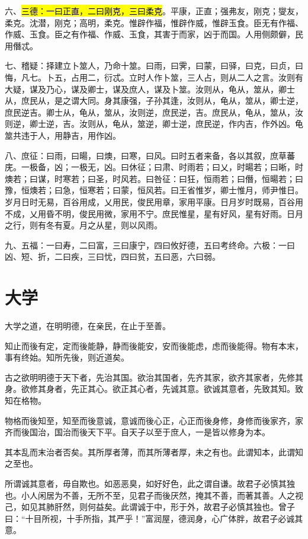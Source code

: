 六、\hl{三德：一曰正直，二曰刚克，三曰柔克}。平康，正直；强弗友，刚克；燮友，柔克。沈潜，刚克；高明，柔克。惟辟作福，惟辟作威，惟辟玉食。臣无有作福、作威、玉食。臣之有作福、作威、玉食，其害于而家，凶于而国。人用侧颇僻，民用僭忒。

七、稽疑：择建立卜筮人，乃命十筮。曰雨，曰霁，曰蒙，曰驿，曰克，曰贞，曰悔，凡七。卜五，占用二，衍忒。立时人作卜筮，三人占，则从二人之言。汝则有大疑，谋及乃心，谋及卿士，谋及庶人，谋及卜筮。汝则从，龟从，筮从，卿士从，庶民从，是之谓大同。身其康强，子孙其逢，汝则从，龟从，筮从，卿士逆，庶民逆吉。卿士从，龟从，筮从，汝则逆，庶民逆，吉。庶民从，龟从，筮从，汝则逆，卿士逆，吉。汝则从，龟从，筮逆，卿士逆，庶民逆，作内吉，作外凶。龟筮共违于人，用静吉，用作凶。

八、庶征：曰雨，曰暘，曰燠，曰寒，曰风。曰时五者来备，各以其叙，庶草蕃庑。一极备，凶；一极无，凶。曰休征；曰肃、时雨若；曰乂，时暘若；曰晰，时燠若；曰谋，时寒若；曰圣，时风若。曰咎征：曰狂，恒雨若；曰僭，恒暘若；曰豫，恒燠若；曰急，恒寒若；曰蒙，恒风若。曰王省惟岁，卿士惟月，师尹惟日。岁月日时无易，百谷用成，乂用民，俊民用章，家用平康。日月岁时既易，百谷用不成，乂用昏不明，俊民用微，家用不宁。庶民惟星，星有好风，星有好雨。日月之行，则有冬有夏。月之从星，则以风雨。

九、五福：一曰寿，二曰富，三曰康宁，四曰攸好德，五曰考终命。六极：一曰凶、短、折，二曰疾，三曰忧，四曰贫，五曰恶，六曰弱。

\section{大学}

大学之道，在明明德，在亲民，在止于至善。

知止而後有定，定而後能静，静而後能安，安而後能虑，虑而後能得。物有本末，事有终始。知所先後，则近道矣。

古之欲明明德于天下者，先治其国。欲治其国者，先齐其家，欲齐其家者，先修其身。欲修其身者，先正其心。欲正其心者，先诚其意。欲诚其意者，先致其知。致知在格物。

物格而後知至，知至而後意诚，意诚而後心正，心正而後身修，身修而後家齐，家齐而後国治，国治而後天下平。自天子以至于庶人，一是皆以修身为本。

其本乱而末治者否矣。其所厚者薄，而其所薄者厚，未之有也。此谓知本，此谓知之至也。

所谓诚其意者，毋自欺也。如恶恶臭，如好好色，此之谓自谦。故君子必慎其独也。小人闲居为不善，无所不至，见君子而後厌然，掩其不善，而著其善。人之视己，如见其肺肝然，则何益矣。此谓诚于中，形于外，故君子必慎其独也。曾子曰：“十目所视，十手所指，其严乎！”富润屋，德润身，心广体胖，故君子必诚其意。


